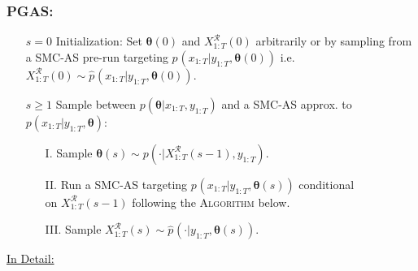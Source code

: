 \documentclass[a4paper,12pt]{scrartcl} %
\newcommand{\given}{\lvert}
\newcommand{\seqtT}{{1:T}}
\newcommand{\rt}{\boldsymbol{\theta}}
\begin{document}
\subsubsection{PGAS:}
\begin{itemize}
\item[$s=0$] Initialization: Set $\rt(0)$ and $X_{\seqtT}^{\mathcal{R}}(0)$ arbitrarily or by sampling from a SMC-AS pre-run targeting $p_{}(x_{\seqtT}\given y_{\seqtT},\rt(0))$ i.e. $X_{\seqtT}^{\mathcal{R}}(0)\sim \widehat{p}_{}(x_{\seqtT}\given y_{\seqtT},\rt(0))$.
\item[$s\geq 1$] Sample between $p
(\rt\given x_{\seqtT},y_{\seqtT})$ and a SMC-AS  
approx. to $p(x_{\seqtT}\given y_{\seqtT},\rt)$:
\begin{itemize}
\item[I.] Sample $\rt(s)\sim p
(\cdot\given X_{\seqtT}^{\mathcal{R}}(s-1),y_{\seqtT})$\;.
\item[II.] Run a SMC-AS targeting
$p_{}(x_{\seqtT}\given y_{\seqtT},\rt(s))$ conditional \\on $X_{\seqtT}^{\mathcal{R}}(s-1)$ following the  \textsc{Algorithm} below\;.
\item[III.] Sample $X_{\seqtT}^{\mathcal{R}}(s)\sim\widehat{p}_{}(\cdot\given y_{\seqtT},\rt(s))$\;.
\end{itemize}
\end{itemize}
\clearpage
\underline{In Detail:}
\clearpage
\end{document}
